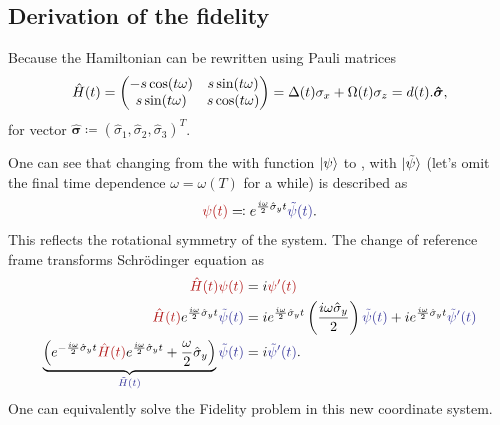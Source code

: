 \subsection{Derivation of the fidelity}
Because the Hamiltonian can be rewritten using Pauli matrices
\begin{equation}
    \hat{H}(t) = 
        \begin{pmatrix}
         -s \cos (t \omega ) & s \sin (t \omega ) \\
         s \sin (t \omega ) & s \cos (t \omega ) \\
        \end{pmatrix}
        =\Delta(t)\sigma_x+ \Omega(t)\sigma_z= d(t).\mathbf{\hat{\bm\sigma}},
\end{equation}
for vector $\hat{\bm\sigma}\coloneqq (\hat\sigma_1,\hat\sigma_2,\hat\sigma_3)^T$.

One can see that changing from the  with function $\ket{\psi}$ to , with $\ket{\tilde\psi}$ (let's omit the final time dependence $\omega=\omega(T)$ for a while) is described as
\begin{equation}
    \redd{\psi(t)} \eqqcolon \expsp \bluee{\tilde\psi(t)}.
\end{equation}
This reflects the rotational symmetry of the system. The change of reference frame transforms Schr\"odinger equation as
\begin{equation}
    \begin{split}
        \redd{\HH(t)\psi(t)} &= i\redd{\psi'(t)}\\
        \redd{\HH(t)} \expsp\bluee{\tilde\psi(t)} &= i \expsp \left(\frac{i\omega\hat\sigma_y}{2}\right)\bluee{\tilde\psi(t)}+i\expsp\bluee{\tilde\psi'(t)}\\
        \underbrace{\left(\expsm \redd{\HH(t)}\expsp+ \frac{\omega}{2}\hat\sigma_y\right)}_{\bluee{\tilde H(t)}}\bluee{\tilde\psi(t)}&=i\bluee{\tilde\psi'(t)}.
    \end{split}
\end{equation}
One can equivalently solve the Fidelity problem in this new coordinate system.

